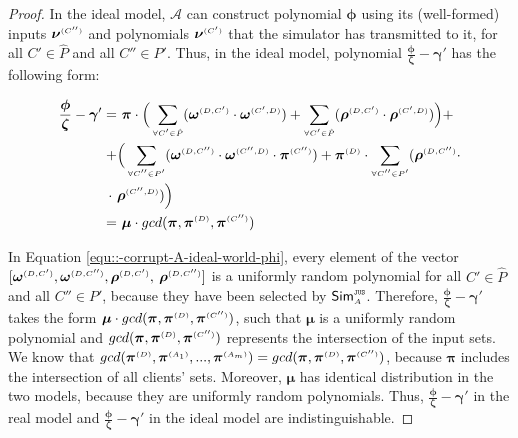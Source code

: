 \begin{proof}
In the ideal model, $\mathcal{A}$ can construct polynomial $ {\bm\phi}$ using its (well-formed) inputs $ {\bm\nu}^{ \scriptscriptstyle {  {(C'')}} }$ and polynomials $ {\bm\nu}^{ \scriptscriptstyle {  {(C')}} }$ that the simulator has transmitted to it, for all $C'\in\hat P$ and all $C''\in P'$. Thus, in the ideal model, polynomial $\frac{ {\bm\phi}}{\bm\zeta}-  {\bm\gamma'}$ has the following form:

\begin{equation}\label{equ::-corrupt-A-ideal-world-phi}
\begin{split}
%
\frac{ {\bm\phi}}{\bm\zeta}-  {\bm\gamma'}  = &\  { \bm\pi}\cdot\Big(\sum\limits_{\st \forall C'\in \hat P}(\bm\omega^{ \st {  {(D, C')}}} \cdot \bm\omega^{ \st {  {(C', D)}}}) + \sum\limits_{\st \forall C'\in \hat P}(\bm\rho^{ \st {  {(D, C')}}} \cdot \bm\rho^{ \st {  {(C', D)}}})\Big)+\\+ & \Big(\sum\limits_{\st \forall C''\in P'}(\bm\omega^{ \st {  {(D,C'')}}} \cdot \bm\omega^{ \st {  {(C'',D)}}}\cdot \bm\pi^{ \st {  (C'')}}) +\bm\pi^{ \st {  {(D)}}}\cdot\sum\limits_{\st \forall C''\in P'} (\bm\rho^{ \st {  {(D, C'')}}}\cdot \\ \cdot \ & \bm\rho^{ \st {  {(C'',D)}}})\Big) \\  =  &\ {\bm\mu}\cdot gcd(  {\bm\pi}, \bm\pi^{ \st {  {(D)}}}, \bm\pi^{ \st {  {(C'')}}})
 \end{split}
\end{equation}

In Equation \ref{equ::-corrupt-A-ideal-world-phi}, every element of the vector $[\bm\omega^{ \scriptscriptstyle {  {(D,C')}}}, \bm\omega^{ \scriptscriptstyle {  {(D,C'')}}}, \bm\rho^{ \scriptscriptstyle {  {(D,C')}}}, $ $\bm\rho^{ \scriptscriptstyle {  {(D,C'')}}}]$ is a uniformly random polynomial for all $C'\in\hat P$ and all $C''\in P'$, because they have been selected by $\mathsf{Sim}^{\scriptscriptstyle \mathtt{JUS}}_{\scriptscriptstyle A}$. Therefore, $\frac{ {\bm\phi}}{\bm\zeta}-  {\bm\gamma'}$ takes the form $ {\bm\mu}\cdot gcd(  {\bm\pi}, \bm\pi^{ \scriptscriptstyle {  {(D)}}}, \bm\pi^{ \scriptscriptstyle {  {(C'')}}})$, such that $ {\bm\mu}$ is a uniformly random polynomial and $gcd(  {\bm\pi}, \bm\pi^{ \scriptscriptstyle {  {(D)}}}, \bm\pi^{ \scriptscriptstyle {  {(C'')}}})$ represents the intersection of the input sets. We know that $gcd( \bm\pi^{ \scriptscriptstyle {  {(D)}} },\bm\pi^{\scriptscriptstyle (A_1)}, ..., \bm\pi^{\scriptscriptstyle (A_m)})=gcd(  {\bm\pi}, \bm\pi^{ \scriptscriptstyle {  {(D)}}}, \bm\pi^{ \scriptscriptstyle {  {(C'')}}})$, because $ {\bm\pi}$ includes the intersection of all clients' sets. Moreover, $ {\bm\mu}$ has identical distribution in the two models, because they are uniformly random polynomials. Thus,  $\frac{\bm\phi}{\bm\zeta}- \bm\gamma'$ in the real model and $\frac{ {\bm\phi}} { {\bm\zeta}}-  {\bm\gamma'}$ in the ideal model are indistinguishable.



\end{proof}
